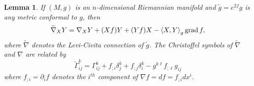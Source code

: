 \documentclass{amsart}
\numberwithin{equation}{section}
\newcommand{\del}{\partial}
\newcommand{\law}{\left\langle}
\newcommand{\raw}{\right\rangle}
\newcommand{\grad}{\mathop{\mathrm{grad}}}
\theoremstyle{plain}
\newtheorem{lem}[thm]{Lemma}
\theoremstyle{definition}
\theoremstyle{remark}
\begin{document}
\begin{lem}
    If $(M,g)$ is an $n$-dimensional Riemannian manifold and $\tilde{g} = e^{2f}g$ is any metric conformal to $g$, then
    \begin{equation}\label{eq:tilde{nabla}}\widetilde{\nabla}_X Y = \nabla_X Y + (Xf)Y + (Yf)X - \law X,Y \raw_g \grad{f},\end{equation}
    where $\widetilde{\nabla}$ denotes the Levi-Civita connection of $\tilde{g}$. The Christoffel symbols of $\widetilde{\nabla}$ and $\nabla$ are related by
    \begin{equation}\label{eq:conformalChristoffel}
        \widetilde{\Gamma}_{ij}^k = \Gamma_{ij}^k + f_{;i}\delta_j^k + f_{;j}\delta^k_i - g^{k\ell}f_{;\ell}g_{ij}
    \end{equation} 
    where $f_{;i} = \del_i f$ denotes the $i^{th}$ component of $\nabla f = df = f_{;i}dx^i$.
\end{lem}
\end{document}
